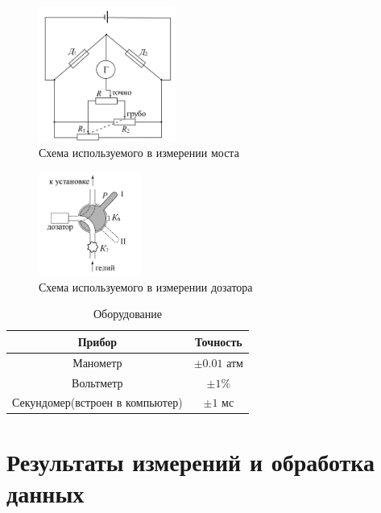 \documentclass[a4paper,12pt]{article}
\begin{document}
\begin{figure}[h!]
\begin{center}
    \includegraphics[width=0.4\textwidth]{most.png}
\end{center}
    \caption{Схема используемого в измерении моста} \label{most.png}
\end{figure}
\begin{figure}[h!]
\begin{center}
    \includegraphics[width=0.3\textwidth]{dozator.png}
\end{center}
    \caption{Схема используемого в измерении дозатора} \label{dozator.png}
\end{figure}
\begin{center}

 \begin{table}[h!]
    \centering
    \caption{Оборудование}
    \begin{tabular}{|c|c|}
    \hline
    Прибор  &   Точность\\ \hline
 Манометр & $\pm 0.01$  атм\\ \hline
 Вольтметр & $\pm 1\%$  \\ \hline
 Секундомер(встроен в компьютер) & $\pm 1 $ мс \\ \hline
    \end{tabular}
    \end{table}
\end{center}

\section{Результаты измерений и обработка данных}
\end{document}
